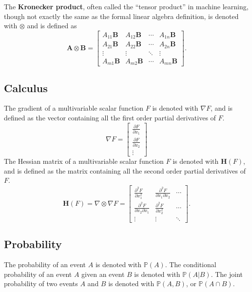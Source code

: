 \documentclass[12pt]{report}
\theoremstyle{definition}
\theoremstyle{remark}
\begin{document}
The \textbf{Kronecker product}, often called the ``tensor product'' in machine learning, though not exactly the same as the formal linear algebra definition, is denoted with $\otimes$ and is defined as
\begin{equation}
    \mathbf{A} \otimes \mathbf{B} = \begin{bmatrix}
        A_{11}\mathbf{B} & A_{12}\mathbf{B} & \cdots & A_{1n}\mathbf{B} \\
        A_{21}\mathbf{B} & A_{22}\mathbf{B} & \cdots & A_{2n}\mathbf{B} \\
        \vdots & \vdots & \ddots & \vdots \\
        A_{m1}\mathbf{B} & A_{m2}\mathbf{B} & \cdots & A_{mn}\mathbf{B}
    \end{bmatrix}.
\end{equation}

\subsection{Calculus}
The gradient of a multivariable scalar function $F$ is denoted with $\nabla F$, and is defined as the vector containing all the first order partial derivatives of $F$.
\begin{equation}
    \nabla F = \begin{bmatrix}
        \frac{\partial F}{\partial x_1} \\
        \frac{\partial F}{\partial x_2} \\
        \vdots
    \end{bmatrix}
\end{equation}
The Hessian matrix of a multivariable scalar function $F$ is denoted with $\mathbf{H}(F)$, and is defined as the matrix containing all the second order partial derivatives of $F$.
\begin{equation}
    \mathbf{H}(F) = \nabla \otimes \nabla F =
    \begin{bmatrix}
        \frac{\partial^2 F}{\partial x_1^2} & \frac{\partial^2 F}{\partial x_1 \partial x_2} & \cdots \\
        \frac{\partial^2 F}{\partial x_2 \partial x_1} & \frac{\partial^2 F}{\partial x_2^2} & \cdots \\
        \vdots & \vdots & \ddots
    \end{bmatrix}.
\end{equation}

\subsection{Probability}
The probability of an event $A$ is denoted with $\mathbb{P}(A)$. The conditional probability of an event $A$ given an event $B$ is denoted with $\mathbb{P}(A|B)$. The joint probability of two events $A$ and $B$ is denoted with $\mathbb{P}(A,B)$, or $\mathbb{P}(A \cap B)$.
\end{document}
